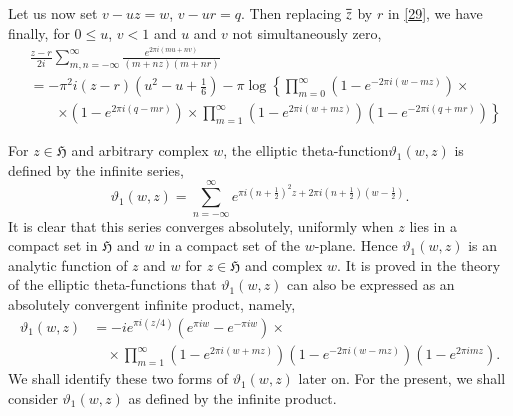 Let us now set $v-uz=w$, $v-ur=q$. Then replacing $\overline{z}$ by $r$ in
\eqref{29}, we have finally, for $0\leq u$, $v<1$ and $u$ and $v$ not
simultaneously zero,
\begin{align*}
& \frac{z-r}{2i}\sum^{\infty}_{m,n=-\infty}\frac{e^{2\pi
      i(mu+nv)}}{(m+nz)(m+nr)}\\
&= -\pi^{2}i(z-r)\left(u^{2}-u+\frac{1}{6}\right)-\pi
  \log\left\{\prod^{\infty}_{m=0}(1-e^{-2\pi i(w-mz)})\times\right.\\
&\qquad \left.\times (1-e^{2\pi i(q-mr)})\times
  \prod^{\infty}_{m=1}(1-e^{2\pi i(w+mz)})(1-e^{-2\pi
    i(q+mr)})\right\}\tag{35}\label{35} 
\end{align*}

For $z\in \mathfrak{H}$ and arbitrary complex $w$, the elliptic
theta-function\break $\vartheta_{1}(w,z)$ is defined by the infinite series,
$$
\vartheta_{1}(w,z)=\sum^{\infty}_{n=-\infty}e^{\pi
  i(n+\frac{1}{2})^{2}z+2\pi i(n+\frac{1}{2})(w-\frac{1}{2})}.
$$
It is clear that this series converges absolutely, uniformly when $z$
lies in a compact set in $\mathfrak{H}$ and $w$ in a compact set of
the $w$-plane. Hence $\vartheta_{1}(w,z)$ is an analytic function of
$z$ and $w$ for $z\in\mathfrak{H}$ and complex $w$. It is proved in
the theory of the elliptic theta-functions that $\vartheta_{1}(w,z)$
can also be expressed as an absolutely convergent infinite product,
namely,
\begin{align*}
\vartheta_{1}(w,z) &= -ie^{\pi i(z/4)}(e^{\pi iw}-e^{-\pi iw})\times\\
&\quad \times\prod^{\infty}_{m=1}(1-e^{2\pi i(w+mz)})(1-e^{-2\pi
  i(w-mz)})(1-e^{2\pi imz}).\tag{36}\label{36}
\end{align*}
We shall identify these two forms of $\vartheta_{1}(w,z)$ later
on. For the present, we shall consider $\vartheta_{1}(w,z)$ as defined
by the infinite product.

